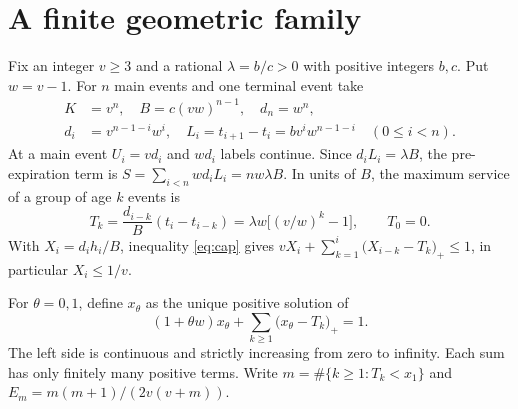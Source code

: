 \documentclass[11pt,letterpaper]{article}
\newcommand{\pos}[1]{\bigl(#1\bigr)_{+}}
\begin{document}
\newpage
\section{A finite geometric family}
Fix an integer $v\ge3$ and a rational $\lambda=b/c>0$ with positive integers $b,c$. Put $w=v-1$. For $n$ main events and one terminal event take
\begin{align}
 K&=v^n,\quad B=c(vw)^{n-1},\quad d_n=w^n,\nonumber\\
 d_i&=v^{n-1-i}w^i,\quad L_i=t_{i+1}-t_i=bv^i w^{n-1-i}\quad(0\le i<n).\label{eq:inst}
\end{align}
At a main event $U_i=vd_i$ and $wd_i$ labels continue. Since $d_i L_i=\lambda B$, the pre-expiration term is $S=\sum_{i<n}wd_i L_i=nw\lambda B$. In units of $B$, the maximum service of a group of age $k$ events is
\[
 T_k=\frac{d_{i-k}}B(t_i-t_{i-k})=\lambda w\big[(v/w)^k-1\big],\qquad T_0=0 .
\]
With $X_i=d_i h_i/B$, inequality \eqref{eq:cap} gives $vX_i+\sum_{k=1}^{i}\pos{X_{i-k}-T_k}\le1$, in particular $X_i\le1/v$.

For $\theta=0,1$, define $x_\theta$ as the unique positive solution of
\begin{equation}
 (1+\theta w)x_\theta+\sum_{k\ge1}\pos{x_\theta-T_k}=1.\label{eq:stationary}
\end{equation}
The left side is continuous and strictly increasing from zero to infinity. Each sum has only finitely many positive terms. Write $m=\#\{k\ge1:T_k<x_1\}$ and $E_m=m(m+1)/(2v(v+m))$.
\end{document}
